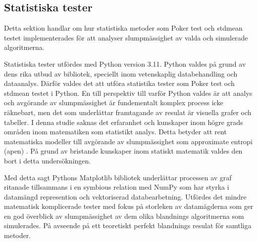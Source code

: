 \documentclass[swedish,a4paper]{article}
\begin{document}
\subsection{Statistiska tester}
Detta sektion handlar om hur statistiska metoder som Poker test och 
\gls{stdmean} testet implementerades för att analyser slumpmässighet av valda
och simulerade algoritmerna.

Statistiska tester utfördes med Python version 3.11. Python valdes på
grund av dens rika utbud av bibliotek, speciellt inom
veten\-skaplig data\-behandling och data\-analys. Därför valdes det
att utföra statistika tester som Poker test och \gls{stdmean} testet i Python.
En till perspektiv till varför Python valdes är att analys och avgörande
av slump\-mässighet är fundementalt komplex process icke räknebart, men det som
underlättar framtagande av resulat är visuella grafer och tabeller. I
denna studie saknas det erfaranhet och kunskaper inom högre grads
områden inom matematiken som statistikt analys. Detta betyder att rent
matematiska modeller till avgörande av slumpmässighet som approximate
entropi (\gls{apen})  \parencite{ApEn}. På grund av bristande kunskaper
inom statiskt matematik valdes den bort i detta undersökningen. 



Med detta sagt Pythons Matplotlib bibliotek underlättar processen av
graf ritanade tillsammans i en symbious relation med NumPy som har styrka i
datamängd represention och vektoriserad data\-bearbetning. Utfördes det
mindre matematisk komplicerade tester med fokus på storleken av
datamägderna som ger en god överblick av slumpmässighet av dem olika
blandnings algoritmerna som simulerades. På avseende på ett teoretiskt
perfekt blandnings resulat för samtliga metoder.

\end{document}
